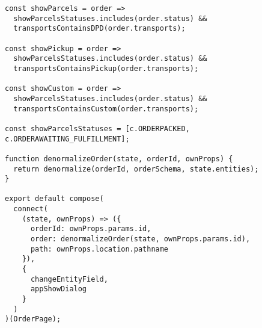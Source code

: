 \begin{lstlisting}[caption=Komponent v \JS{} s Redux-om, label={lst:jsComponent}]
const showParcels = order =>
  showParcelsStatuses.includes(order.status) &&
  transportsContainsDPD(order.transports);

const showPickup = order =>
  showParcelsStatuses.includes(order.status) &&
  transportsContainsPickup(order.transports);

const showCustom = order =>
  showParcelsStatuses.includes(order.status) &&
  transportsContainsCustom(order.transports);

const showParcelsStatuses = [c.ORDERPACKED, c.ORDERAWAITING_FULFILLMENT];

function denormalizeOrder(state, orderId, ownProps) {
  return denormalize(orderId, orderSchema, state.entities);
}

export default compose(
  connect(
    (state, ownProps) => ({
      orderId: ownProps.params.id,
      order: denormalizeOrder(state, ownProps.params.id),
      path: ownProps.location.pathname
    }),
    {
      changeEntityField,
      appShowDialog
    }
  )
)(OrderPage);

\end{lstlisting}